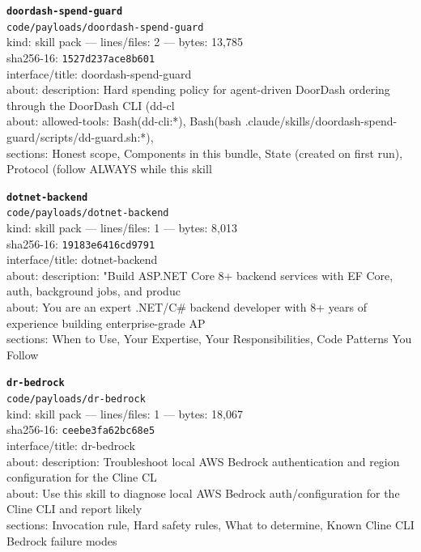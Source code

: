 \noindent\textbf{\texttt{doordash-spend-guard}}\\
\texttt{code/payloads/doordash-spend-guard}\\
kind: skill pack --- lines/files: 2 --- bytes: 13,785\\
sha256-16: \texttt{1527d237ace8b601}\\
interface/title: doordash-spend-guard\\
about: description: Hard spending policy for agent-driven DoorDash ordering through the DoorDash CLI (dd-cl\\
about: allowed-tools: Bash(dd-cli:*), Bash(bash .claude/skills/doordash-spend-guard/scripts/dd-guard.sh:*),\\
sections: Honest scope, Components in this bundle, State (created on first run), Protocol (follow ALWAYS while this skill\\
\vspace*{6.0pt}

\noindent\textbf{\texttt{dotnet-backend}}\\
\texttt{code/payloads/dotnet-backend}\\
kind: skill pack --- lines/files: 1 --- bytes: 8,013\\
sha256-16: \texttt{19183e6416cd9791}\\
interface/title: dotnet-backend\\
about: description: "Build ASP.NET Core 8+ backend services with EF Core, auth, background jobs, and produc\\
about: You are an expert .NET/C\# backend developer with 8+ years of experience building enterprise-grade AP\\
sections: When to Use, Your Expertise, Your Responsibilities, Code Patterns You Follow\\
\vspace*{6.0pt}

\noindent\textbf{\texttt{dr-bedrock}}\\
\texttt{code/payloads/dr-bedrock}\\
kind: skill pack --- lines/files: 1 --- bytes: 18,067\\
sha256-16: \texttt{ceebe3fa62bc68e5}\\
interface/title: dr-bedrock\\
about: description: Troubleshoot local AWS Bedrock authentication and region configuration for the Cline CL\\
about: Use this skill to diagnose local AWS Bedrock auth/configuration for the Cline CLI and report likely \\
sections: Invocation rule, Hard safety rules, What to determine, Known Cline CLI Bedrock failure modes\\
\vspace*{6.0pt}

